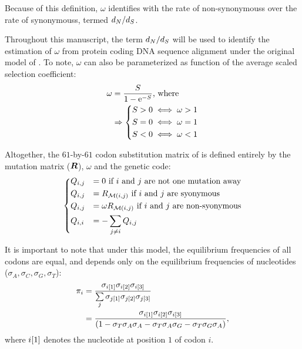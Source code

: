Because of this definition, $\omega$ identifies with the rate of \glspl{non-synonymous} over the rate of \glspl{synonymous}, termed $d_N / d_S$.

Throughout this manuscript, the term $d_N / d_S$ will be used to identify the estimation of $\omega$ from protein coding \acrshort{DNA} sequence alignment under the original model of \citet{Muse1994}.
To note, $\omega$ can also be parameterized as function of the average scaled selection coefficient:
\begin{align}
\omega & = \dfrac{S}{1 - \mathrm{e}^{-S}} \text{, where }\\
& \Rightarrow	\begin{dcases}
	S > 0 \iff \omega > 1 \\
	S = 0 \iff \omega = 1 \\
	S < 0 \iff \omega < 1
	\end{dcases}
\end{align}

Altogether, the $61$-by-$61$ \gls{codon} \gls{substitution} matrix of \citet{Muse1994} is defined entirely by the mutation matrix ($\bm{R}$), $\omega$ and the genetic code:
\begin{equation}
\begin{dcases}
Q_{{i}, {j}} & = 0 \text{ if ${i}$ and ${j}$ are not one mutation away} \\
Q_{{i}, {j}} & = R_{\mathcal{M}({i}, {j})} \text{ if ${i}$ and ${j}$ are syonymous} \\
Q_{{i}, {j}} & = \omega R_{\mathcal{M}({i}, {j})} \text{ if ${i}$ and ${j}$ are non-syonymous} \\
Q_{{i}, {i}} & = - \sum\limits_{{j} \neq {i}} Q_{{i}, {j}}
\end{dcases}
\label{eq:codon-models}
\end{equation}

It is important to note that under this model, the equilibrium frequencies of all \glspl{codon} are equal, and depends only on the equilibrium frequencies of nucleotides ($\sigma_{A}, \sigma_{C}, \sigma_{G}, \sigma_{T}$):
\begin{align}
\pi_{{i}} & = \dfrac{\sigma_{{i}[1]}\sigma_{{i}[2]}\sigma_{{i}[3]}}{\sum\limits_{{j}}\sigma_{{j}[1]}\sigma_{{j}[2]}\sigma_{{j}[3]} } \\
 & = \dfrac{\sigma_{{i}[1]}\sigma_{{i}[2]}\sigma_{{i}[3]}}{(1 - \sigma_{T}\sigma_{A}\sigma_{A} - \sigma_{T}\sigma_{A}\sigma_{G} - \sigma_{T}\sigma_{G}\sigma_{A} )},
\end{align}
where ${i}[1]$ denotes the nucleotide at position $1$ of \gls{codon} $i$.

